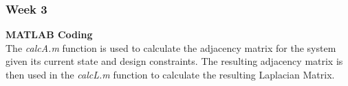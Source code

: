 \documentclass[../CourseManual.tex]{subfiles}
\begin{document}



\subsubsection{Week 3} \label{Week 3: Formation}
\textbf{MATLAB Coding}\\
The \textit{calcA.m} function is used to calculate the adjacency matrix for the system given its current state and design constraints. The resulting adjacency matrix is then used in the \textit{calcL.m} function to calculate the resulting Laplacian Matrix.\\
\end{document}
